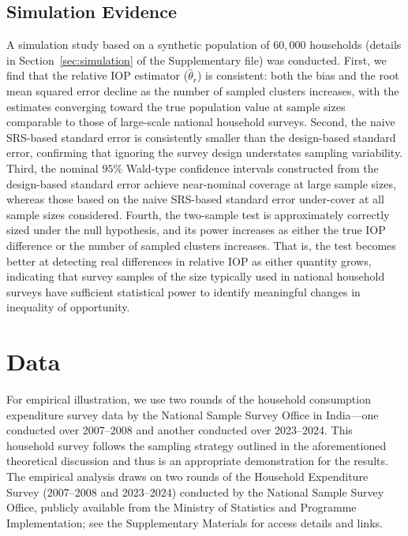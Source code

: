 \documentclass[12pt]{article}
\theoremstyle{plain}
\theoremstyle{definition}
\begin{document}
\subsection{Simulation Evidence}
A simulation study based on a synthetic population of $60{,}000$ households (details in Section~\ref{sec:simulation} of the Supplementary file) was conducted. First, we find that the relative IOP estimator ($\hat{\theta}_r$) is consistent: both the bias and the root mean squared error decline as the number of sampled clusters increases, with the estimates converging toward the true population value at sample sizes comparable to those of large-scale national household surveys. Second, the naive SRS-based standard error is consistently smaller than the design-based standard error, confirming that ignoring the survey design understates sampling variability. Third, the nominal $95\%$ Wald-type confidence intervals constructed from the design-based standard error achieve near-nominal coverage at large sample sizes, whereas those based on the naive SRS-based standard error under-cover at all sample sizes considered. Fourth, the two-sample test is approximately correctly sized under the null hypothesis, and its power increases as either the true IOP difference or the number of sampled clusters increases. That is, the test becomes better at detecting real differences in relative IOP as either quantity grows, indicating that survey samples of the size typically used in national household surveys have sufficient statistical power to identify meaningful changes in inequality of opportunity.

\section{Data}
\label{sec:Data}

For empirical illustration, we use two rounds of the household consumption expenditure survey data by the National Sample Survey Office in India---one conducted over 2007--2008 and another conducted over 2023--2024. This household survey follows the sampling strategy outlined in the aforementioned theoretical discussion and thus is an appropriate demonstration for the results. The empirical analysis draws on two rounds of the Household Expenditure Survey (2007--2008 and 2023--2024) conducted by the National Sample Survey Office, publicly available from the Ministry of Statistics and Programme Implementation; see the Supplementary Materials for access details and links.
\end{document}
